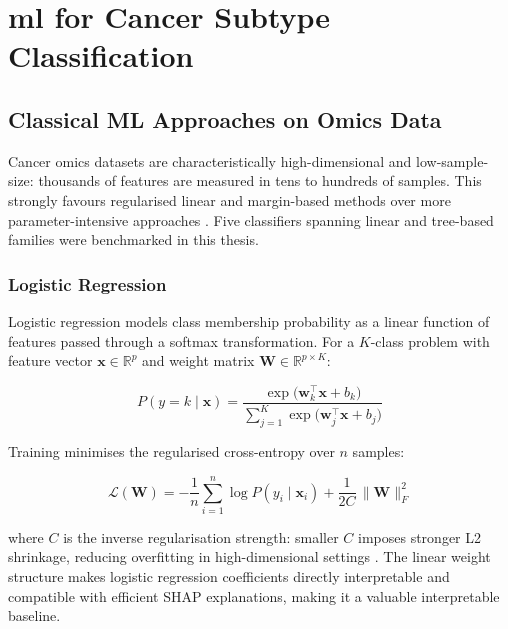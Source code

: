 \section{\gls{ml} for Cancer Subtype Classification}

\subsection{Classical ML Approaches on Omics Data}

Cancer omics datasets are characteristically high-dimensional and low-sample-size: thousands of features are measured in tens to hundreds of samples. This strongly favours regularised linear and margin-based methods over more parameter-intensive approaches \parencite{Vabalas2019}. Five classifiers spanning linear and tree-based families were benchmarked in this thesis.

\subsubsection{Logistic Regression}

Logistic regression models class membership probability as a linear function of features passed through a softmax transformation. For a $K$-class problem with feature vector $\mathbf{x} \in \mathbb{R}^p$ and weight matrix $\mathbf{W} \in \mathbb{R}^{p \times K}$:

\begin{equation}
P(y = k \mid \mathbf{x}) =
    \frac{\exp\!\bigl(\mathbf{w}_k^\top \mathbf{x} + b_k\bigr)}
         {\sum_{j=1}^{K} \exp\!\bigl(\mathbf{w}_j^\top \mathbf{x} + b_j\bigr)}
\label{eq:softmax}
\end{equation}


Training minimises the regularised cross-entropy over $n$ samples:

\begin{equation}
\mathcal{L}(\mathbf{W}) =
    -\frac{1}{n}\sum_{i=1}^{n} \log P(y_i \mid \mathbf{x}_i)
    + \frac{1}{2C}\,\|\mathbf{W}\|_F^2
\label{eq:lr_loss}
\end{equation}


where $C$ is the inverse regularisation strength: smaller $C$ imposes stronger L2 shrinkage, reducing overfitting in high-dimensional settings \parencite{Pedregosa2011}. The linear weight structure makes logistic regression coefficients directly interpretable and compatible with efficient SHAP explanations, making it a valuable interpretable baseline.


